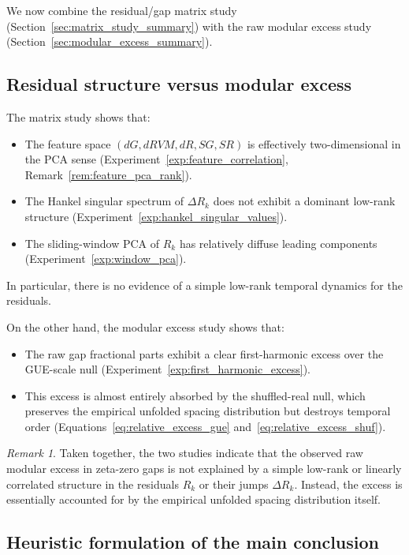\documentclass[11pt]{amsart}
\numberwithin{equation}{section}
\theoremstyle{plain}
\theoremstyle{definition}
\theoremstyle{remark}
\newtheorem{remark}[theorem]{Remark}
\begin{document}
We now combine the residual/gap matrix study
(Section~\ref{sec:matrix_study_summary})
with the raw modular excess study
(Section~\ref{sec:modular_excess_summary}).

\subsection{Residual structure versus modular excess}
\label{subsec:residual_vs_modular}

The matrix study shows that:
\begin{itemize}[leftmargin=*]
\item The feature space $(dG,dRVM,dR,SG,SR)$ is effectively
two-dimensional in the PCA sense
(Experiment~\ref{exp:feature_correlation},
Remark~\ref{rem:feature_pca_rank}).
\item The Hankel singular spectrum of $\Delta R_k$
does not exhibit a dominant low-rank structure
(Experiment~\ref{exp:hankel_singular_values}).
\item The sliding-window PCA of $R_k$ has relatively diffuse
leading components
(Experiment~\ref{exp:window_pca}).
\end{itemize}
In particular, there is no evidence of a simple low-rank temporal
dynamics for the residuals.

On the other hand, the modular excess study shows that:
\begin{itemize}[leftmargin=*]
\item The raw gap fractional parts exhibit a clear first-harmonic
excess over the GUE-scale null
(Experiment~\ref{exp:first_harmonic_excess}).
\item This excess is almost entirely absorbed by the shuffled-real
null, which preserves the empirical unfolded spacing distribution
but destroys temporal order
(Equations~\eqref{eq:relative_excess_gue}
and~\eqref{eq:relative_excess_shuf}).
\end{itemize}

\begin{remark}
\label{rem:integrated_message}
Taken together, the two studies indicate that the observed raw modular
excess in zeta-zero gaps is not explained by a simple low-rank or
linearly correlated structure in the residuals $R_k$ or their jumps
$\Delta R_k$.
Instead, the excess is essentially accounted for by the empirical
unfolded spacing distribution itself.
\end{remark}

\subsection{Heuristic formulation of the main conclusion}
\label{subsec:heuristic_main_conclusion}
\end{document}
